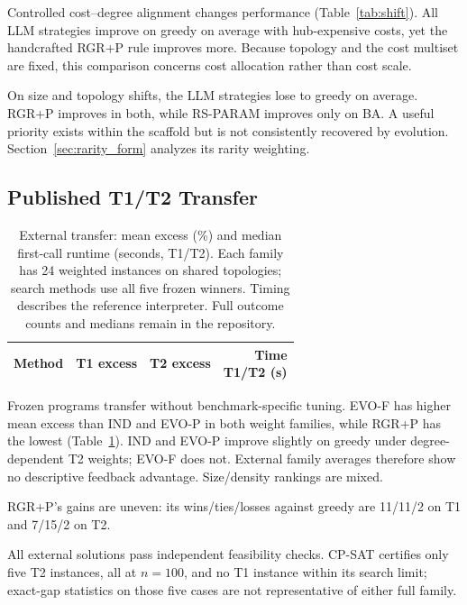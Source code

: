 Controlled cost--degree alignment changes performance
(Table~\ref{tab:shift}). All LLM strategies improve on greedy on average with
hub-expensive costs, yet the handcrafted RGR+P rule improves more.
Because topology and the cost multiset are fixed, this comparison concerns
cost allocation rather than cost scale.

On size and topology shifts, the LLM strategies lose to greedy on average.
RGR+P improves in both, while RS-PARAM improves only on BA. A useful
priority exists within the scaffold but is not consistently recovered by
evolution. Section~\ref{sec:rarity_form} analyzes its rarity weighting.

\subsection{Published T1/T2 Transfer}
\begin{table}[!htbp]
\centering\small
\setlength{\tabcolsep}{3pt}
\caption{External transfer: mean excess (\%) and median first-call runtime
(seconds, T1/T2). Each family has 24 weighted instances on shared topologies;
search methods use all five frozen winners. Timing describes the reference
interpreter. Full outcome counts and medians remain in the repository.}
\label{tab:external}
\begin{tabular*}{\columnwidth}{@{\extracolsep{\fill}}lrrr@{}}
\toprule
Method & T1 excess & T2 excess & \shortstack{Time\\T1/T2 (s)}\\
\midrule

\end{tabular*}
\end{table}

Frozen programs transfer without benchmark-specific tuning.
EVO-F has higher mean excess than IND and EVO-P in both weight families,
while RGR+P has the lowest (Table~\ref{tab:external}).
IND and EVO-P improve slightly on greedy under degree-dependent T2
weights; EVO-F does not. External family averages therefore show no
descriptive feedback advantage. Size/density rankings are mixed.

\begin{samepage}
RGR+P's gains are uneven: its wins/ties/losses against greedy are
11/11/2 on T1 and 7/15/2 on T2.\par
\end{samepage}

\begin{samepage}
All external solutions pass independent feasibility checks. CP-SAT certifies
only five T2 instances, all at $n=100$, and no T1 instance within its search
limit; exact-gap statistics on those five cases are not representative
of either full family.\par
\end{samepage}

